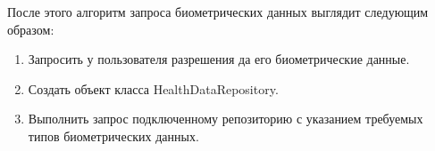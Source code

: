 После этого алгоритм запроса биометрических данных выглядит следующим образом:
\begin{enumerate}
	\item Запросить у пользователя разрешения да его биометрические данные.
	\item Создать объект класса HealthDataRepository.
	\item Выполнить запрос подключенному репозиторию с указанием требуемых типов биометрических данных.
\end{enumerate}